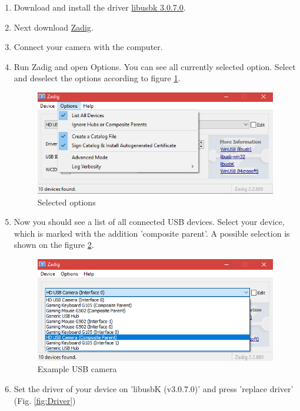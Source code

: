\documentclass[../../Installationguide_Unity_Pupil]{subfiles}
\begin{document}
\begin{enumerate}
	\item Download and install the driver \href{https://sourceforge.net/projects/libusbk/files/libusbK-release/3.0.7.0/libusbK-3.0.7.0-setup.exe/download}{libusbk 3.0.7.0}.
	\item Next download \href{http://zadig.akeo.ie/downloads/zadig_2.2.exe}{Zadig}.
	\item Connect your camera with the computer.
	\item Run Zadig and open Options. You can see all currently selected option. Select and deselect the options according to figure \ref{fig:Options}.
	\begin{figure}[htb]
		\centering
		\includegraphics[width=\textwidth]{img/Zadiq_Options.png}
		\caption{Selected options}
		\label{fig:Options}
	\end{figure}
	\item Now you should see a list of all connected USB devices. Select your device, which is marked with the addition 'composite parent'. A possible selection is shown on the figure \ref{fig:Composite}.
	\begin{figure}[htb]
		\centering
		\includegraphics[width=\textwidth]{img/Zadiq_Composite_Parent.png}
		\caption{Example USB camera}
		\label{fig:Composite}
	\end{figure}
	\item Set the driver of your device on 'libusbK (v3.0.7.0)' and press 'replace driver' (Fig. \ref{fig:Driver})

\end{enumerate}
\end{document}

